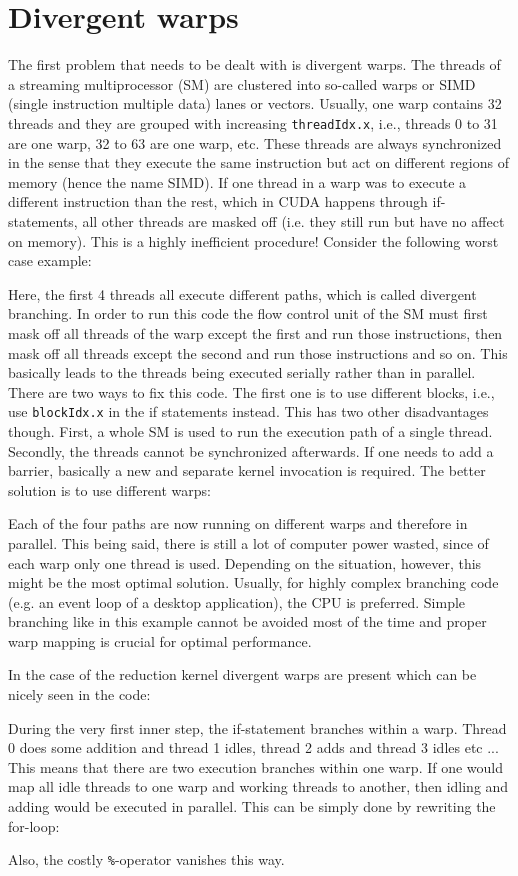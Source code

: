 \section{Divergent warps}
The first problem that needs to be dealt with is divergent warps.
The threads of a streaming multiprocessor (SM) are clustered into so-called warps or SIMD (single instruction multiple data) lanes or vectors.
Usually, one warp contains 32 threads and they are grouped with increasing \texttt{threadIdx.x}, i.e., threads 0 to 31 are one warp, 32 to 63 are one warp, etc.
These threads are always synchronized in the sense that they execute the same instruction but act on different regions of memory (hence the name SIMD).
If one thread in a warp was to execute a different instruction than the rest, which in CUDA happens through if-statements, all other threads are masked off (i.e. they still run but have no affect on memory).
This is a highly inefficient procedure! 
Consider the following worst case example:

Here, the first 4 threads all execute different paths, which is called divergent branching.
In order to run this code the flow control unit of the SM must first mask off all threads of the warp except the first and run those instructions, then mask off all threads except the second and run those instructions and so on.
This basically leads to the threads being executed serially rather than in parallel.
There are two ways to fix this code.
The first one is to use different blocks, i.e., use \texttt{blockIdx.x} in the if statements instead.
This has two other disadvantages though.
First, a whole SM is used to run the execution path of a single thread.
Secondly, the threads cannot be synchronized afterwards.
If one needs to add a barrier, basically a new and separate kernel invocation is required.
The better solution is to use different warps:

Each of the four paths are now running on different warps and therefore in parallel.
This being said, there is still a lot of computer power wasted, since of each warp only one thread is used.
Depending on the situation, however, this might be the most optimal solution.
Usually, for highly complex branching code (e.g. an event loop of a desktop application), the CPU is preferred.
Simple branching like in this example cannot be avoided most of the time and proper warp mapping is crucial for optimal performance. 

In the case of the reduction kernel divergent warps are present which can be nicely seen in the code:

During the very first inner step, the if-statement branches within a warp.
Thread 0 does some addition and thread 1 idles, thread 2 adds and thread 3 idles etc ...
This means that there are two execution branches within one warp.
If one would map all idle threads to one warp and working threads to another, then idling and adding would be executed in parallel.
This can be simply done by rewriting the for-loop:

Also, the costly \texttt{\%}-operator vanishes this way.

